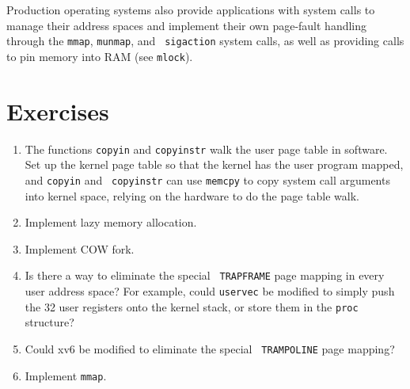 Production operating systems also provide applications with system
calls to manage their address spaces and implement their own
page-fault handling through the {\tt mmap}, {\tt munmap}, and {\tt
  sigaction} system calls, as well as providing calls to pin memory
into RAM (see {\tt mlock}).

\section{Exercises}

\begin{enumerate}

\item The functions {\tt copyin} and {\tt copyinstr} walk the user
  page table in software.  Set up the kernel page table so that the
  kernel has the user program mapped, and {\tt copyin} and {\tt
    copyinstr} can use {\tt memcpy} to copy system call arguments into
  kernel space, relying on the hardware to do the page table walk.

\item Implement lazy memory allocation.

\item Implement COW fork.

\item Is there a way to eliminate the special {\tt
  TRAPFRAME} page mapping in every user address space? For
  example, could
  {\tt uservec} be modified to simply push the 32 user registers
  onto the kernel stack, or store them in the {\tt proc}
  structure?

\item Could xv6 be modified to eliminate the special {\tt
  TRAMPOLINE} page mapping?

\item Implement {\tt mmap}.

\end{enumerate}
